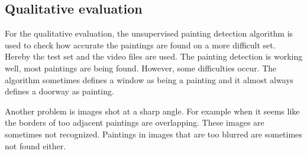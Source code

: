 \subsection{Qualitative evaluation}
For the qualitative evaluation, the unsupervised painting detection algorithm is used to check how accurate the paintings are found on a more difficult set. Hereby the test set and the video files are used. The painting detection is working well, most paintings are being found. However, some difficulties occur. The algorithm sometimes defines a window as being a painting and it almost always defines a doorway as painting.

Another problem is images shot at a sharp angle. For example when it seems like the borders of too adjacent paintings are overlapping. These images are sometimes not recognized. Paintings in images that are too blurred are sometimes not found either.
